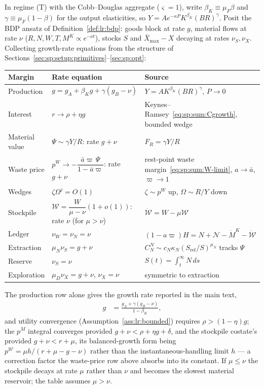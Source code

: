 In regime (T) with the Cobb--Douglas aggregate ($\varsigma=1$), write $\beta_K\equiv\mu_F\beta$ and $\gamma\equiv\mu_F\left(1-\beta\right)$ for the output elasticities, so $Y=Ae^{-\kappa P}K^{\beta_K}\left(BR\right)^{\gamma}$. Posit the BDP ansatz of Definition~\ref{def:lr:bdp}: goods block at rate $g$, material flows at rate $\nu$ ($R,N,W,T,M^K\propto e^{-\nu t}$), stocks $S$ and $\bar X_{\max}-X$ decaying at rates $\nu_S,\nu_X$. Collecting growth-rate equations from the structure of Sections~\ref{sec:sp:setup:primitives}--\ref{sec:sp:opt}:
\begin{center}
\begin{tabular}{lll}
\toprule
Margin & Rate equation & Source \\
\midrule
Production & $g=g_A+\beta_Kg+\gamma\left(g_B-\nu\right)$ & $Y=AK^{\beta_K}\left(BR\right)^{\gamma}$, $P\to0$ \\
Interest & $r\to\rho+\eta g$ & Keynes--Ramsey~\eqref{eq:sp:sum:Cgrowth}, bounded wedge \\
Material value & $\Psi\sim\gamma Y/R$: rate $g+\nu$ & $F_R=\gamma Y/R$ \\
Waste price & $p^W\to-\dfrac{\bar a\varpi\,\Psi}{1-\bar a\varpi}$: rate $g+\nu$ & rest-point waste margin~\eqref{eq:sp:sum:W-limit}, $a\to\bar a$, $\varpi\to1$ \\
Wedges & $\zeta\Omega^j=O\left(1\right)$ & $\zeta\sim p^W$ up, $\Omega\sim R/Y$ down \\
Stockpile & $\mathcal W=\dfrac{W}{\mu-\nu}\left(1+o\left(1\right)\right)$: rate $\nu$ (for $\mu>\nu$) & $\dot{\mathcal W}=W-\mu\mathcal W$ \\
Ledger & $\nu_W=\nu_N=\nu$ & $\left(1-a\varpi\right)H=N+\mathcal N-\dot M^K-\dot{\mathcal W}$ \\
Extraction & $\mu_N\nu_S=g+\nu$ & $C^N_N\sim c_N\kappa_N\left(S_{\mathrm{ref}}/S\right)^{\mu_N}$ tracks $\Psi$ \\
Reserve & $\nu_S=\nu$ & $S(t)=\int_t^\infty N\,ds$ \\
Exploration & $\mu_D\nu_X=g+\nu$, $\nu_X=\nu$ & symmetric to extraction \\
\bottomrule
\end{tabular}
\end{center}
The production row alone gives the growth rate reported in the main text,
\begin{align}
g &= \frac{g_A+\gamma\left(g_B-\nu\right)}{1-\beta_K},
\label{eq:app:wh:g}
\end{align}
and utility convergence (Assumption~\ref{ass:lr:bounded}) requires $\rho>\left(1-\eta\right)g$; the $p^M$ integral converges provided $g+\nu<\rho+\eta g+\delta$, and the stockpile costate's provided $g+\nu<r+\mu$, its balanced-growth form being $p^{\mathcal W}=\mu h/\left(r+\mu-g-\nu\right)$ rather than the instantaneous-handling limit $h$ --- a correction factor the waste-price row above absorbs into its constant. If $\mu\le\nu$ the stockpile decays at rate $\mu$ rather than $\nu$ and becomes the slowest material reservoir; the table assumes $\mu>\nu$.

